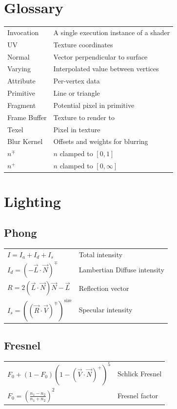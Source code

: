 \documentclass{article}
\begin{document}
\begin{landscape}
\begin{multicols}{3}
            \section{Glossary}
            \begin{tabular}
                {l l}
                Invocation & A single execution instance of a shader \\
                UV & Texture coordinates \\
                Normal & Vector perpendicular to surface \\
                Varying & Interpolated value between vertices \\
                Attribute & Per-vertex data \\
                Primitive & Line or triangle \\
                Fragment & Potential pixel in primitive \\
                Frame Buffer & Texture to render to \\
                Texel & Pixel in texture \\
                Blur Kernel & Offsets and weights for blurring \\
                $n^{\mp}$ & $n$ clamped to $[0, 1]$ \\
                $n^+$ & $n$ clamped to $[0, \infty]$ \\
            \end{tabular}

            \section{Lighting}
            \subsection{Phong}
            \begin{tabular}{l l}
                $I = I_a + I_d + I_s$ & Total intensity \\
                $I_d = (-\vec L \cdot \vec N)^{\mp}$ & Lambertian Diffuse intensity \\
                $R = 2(\vec L \cdot \vec N)\vec N - \vec L$ & Reflection vector \\
                $I_s = ((\vec R \cdot \vec V)^{\mp})^{\text{size}}$ & Specular intensity \\
            \end{tabular}

            \subsection{Fresnel}
            \begin{tabular}{l l}
                $F_0 + (1 - F_0)(1 - (\vec V \cdot \vec N)^+)^5$ & Schlick Fresnel \\
                $F_0 = \left(\frac{n_1 - n_2}{n_1 + n_2}\right)^2$ & Fresnel factor \\
            \end{tabular}

\end{multicols}
\end{landscape}
\end{document}
